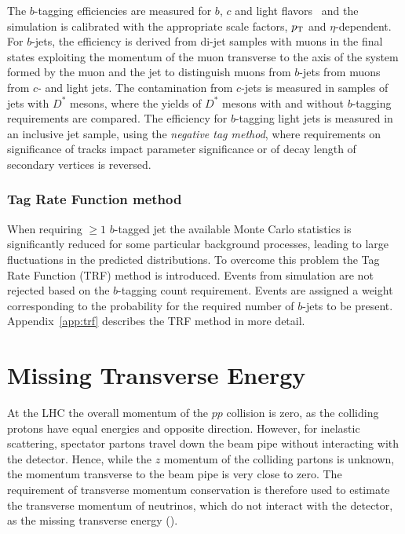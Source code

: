 The $b$-tagging efficiencies are measured for 
$b$, $c$ and light flavors~\cite{btagging,ctagging,ltagging} and the
simulation is calibrated with the appropriate scale factors, $p_{\mathrm{T}}$ and
$\eta$-dependent.
For $b$-jets, the efficiency is derived from di-jet samples with
muons in the final states exploiting the momentum of the
muon transverse to the axis of the system formed by the muon and the jet
to distinguish muons from $b$-jets from muons from $c$- and light jets. 
The contamination from $c$-jets is measured in samples of jets with
$D^*$ mesons, where the yields of $D^*$ mesons with and without
$b$-tagging requirements are compared.
The efficiency for $b$-tagging light jets is measured in an inclusive
jet sample, using the {\it negative tag method}, where requirements on
significance of tracks impact parameter significance or of decay 
length of secondary vertices is reversed.

\subsubsection{Tag Rate Function method}
\label{sec:trf}

When requiring $\geq 1$ $b$-tagged jet the available Monte Carlo
statistics is significantly reduced for some particular background
processes, leading to large fluctuations in the predicted distributions.
To overcome this problem the Tag Rate Function (TRF) method is introduced.
Events from simulation are not rejected based on the $b$-tagging count
requirement. Events are assigned a weight corresponding to the
probability for the required number of $b$-jets to be present.
Appendix~\ref{app:trf} describes the TRF method in more detail.

\section{Missing Transverse Energy}
\label{sec:met}

At the LHC the overall momentum of the $pp$ collision is zero, as the
colliding protons have equal energies and opposite direction. 
However, for inelastic scattering, spectator partons travel down the
beam pipe without interacting with the detector. Hence, while the $z$
momentum of the colliding partons is unknown, the momentum transverse
to the beam pipe is very close to zero. The requirement of transverse
momentum conservation is therefore used to estimate the transverse
momentum of neutrinos, which do not interact with the detector, as the
missing transverse energy (\met{}).  


